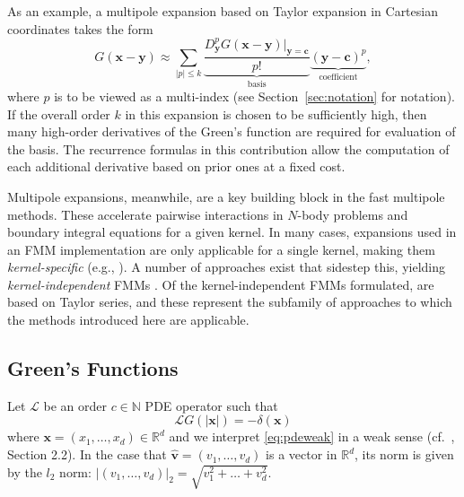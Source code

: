 \documentclass[12pt]{article}
\def\N{{\mathbb N}}
\def\R{{\mathbb R}}
\let\b=\boldsymbol
\def\bhat#1{\hat{\boldsymbol{#1}}}
\theoremstyle{definition}
\theoremstyle{plain}
\theoremstyle{definition}
\begin{document}
As an example, a multipole expansion based on Taylor expansion in Cartesian coordinates takes the form
\[G(\b{x} - \b{y}) \approx \sum _{| p | \leqslant k
     } \underbrace{\frac{D^p_{\b{y}} G
   (\b{x} - \b{y}) |_{\b{y} = \b{c}}
    }{p!}}_{\text{basis}}
   \underbrace{(\b{y} - \b{c})^p}_{\text{coefficient}},
  \]
where $p$ is to be viewed as a multi-index (see Section~\ref{sec:notation}{} for notation). If the overall order $k$ in this expansion is chosen to be sufficiently high, then many high-order derivatives of the Green's function are required for evaluation of the basis. The recurrence formulas in this contribution allow the computation of each additional derivative based on prior ones at a fixed cost.

Multipole expansions, meanwhile, are a key building block in the fast multipole methods. These accelerate pairwise interactions in $N$-body problems and boundary integral equations for a given kernel. In many cases, expansions used in an FMM implementation are only applicable for a single kernel, making them \emph{kernel-specific} (e.g., \cite{greengard1987fast, greengard1988rapid, greengard1988efficient, greengard2002new}). A number of approaches exist that sidestep this, yielding \emph{kernel-independent} FMMs
\cite{ying2004kernel, zhao1987n, oppelstrup2013matrix, shanker2007accelerated, coles2020optimizing, fernando2023automatic}. Of the kernel-independent FMMs formulated, \cite{zhao1987n, oppelstrup2013matrix, shanker2007accelerated, coles2020optimizing, fernando2023automatic} are based on Taylor series, and these represent the subfamily of approaches to which the methods introduced here are applicable.

\subsection{Green's Functions}
\label{sec:green}
Let $\mathcal{L}$ be an order $c \in \N$ PDE operator such that
\begin{equation}
\label{eq:pdeweak}
\mathcal{L} G(|\b{x}|) = -\delta(\b{x})
\end{equation}
where $\b{x} = (x_1, \dots ,x_d) \in \R^d$ and we interpret \eqref{eq:pdeweak} in a weak sense (cf.~\cite{evans2010partial}, Section 2.2). In the case that $\bhat v = (v_1, \dots, v_d)$ is a vector in $\R^d$, its norm is given by the $l_2$ norm: $|(v_1, \dots, v_d)|_2 = \sqrt{v_1^2 + \dots + v_d^2}$.
\end{document}
